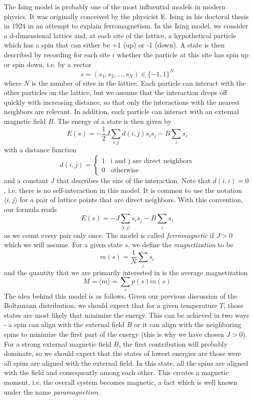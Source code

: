 \documentclass[a4paper, draft]{article}
\theoremstyle{own}
\theoremstyle{remark}
\begin{document}
The Ising model is probably one of the most influential models in modern physics. It was originally conceived by the physicist E. Ising in his doctoral thesis in 1924 in an attempt to explain ferromagnetism. In the Ising model, we consider a d-dimensional lattice and, at each site of the lattice, a hypothetical particle which has a spin that can either be +1 (up) or -1 (down).  A state is then described by recording for each site $i$ whether the particle at this site has spin up or spin down, i.e. by a vector
$$
s = (s_1, s_2 , \dots, s_N ) \in \{ -1, 1\}^N
$$
where $N$ is the number of sites in the lattice. 
Each particle can interact with the other particles on the lattice, but we assume that the interaction drops off quickly with increasing distance, so that only the interactions with the nearest neighbors are relevant. In addition, each particle can interact with an external magnetic field $B$. 
The energy of a state is then given by
$$
E(s) = - \frac{1}{2} J \sum_{i, j} d(i, j) s_i s_j - B \sum_i s_i 
$$
with a distance function
$$
d(i, j) = 
\begin{cases}
1 & \text{i and j are direct neighbors} \\
0 & \text{otherwise}
\end{cases}
$$
and a constant $J$ that describes the size of the interaction. Note that $d(i, i) = 0$, i.e. there is no self-interaction in this model. It is common to use the notation $\langle i, j \rangle$ for a pair of lattice points that are direct neighbors. With this convention, our formula reads
$$
E(s) =  - J \sum_{\langle i, j \rangle }  s_i s_j - B \sum_i s_i 
$$
as we count every pair only once. The model is called {\em ferromagnetic} if $J > 0$ which we will assume. For a given state $s$, we define the {\em magnetization} to be
$$
m(s) = \frac{1}{N} \sum_i s_i
$$
and the quantity that we are primarily interested in is the average magnetization
$$
M = \langle m \rangle = \sum_s p(s) m(s)
$$
The idea behind this model is as follows. Given our previous discussion of the Boltzmann distribution, we should expect that for a given temperature $T$, those states are most likely that minimize the energy. This can be achieved in two ways - a spin can align with the external field $B$ or it can align with the neighboring spins to minimize the first part of the energy (this is why we have chosen $J > 0$). For a strong external magnetic field $B$, the first contribution will probably dominate, so we should expect that the states of lowest energies are those were all spins are aligned with the external field. In this state, all the spins are aligned with the field and consequently among each other. This creates a magnetic moment, i.e. the overall system becomes magnetic, a fact which is well known under the name {\em paramagnetism}. 
\end{document}
